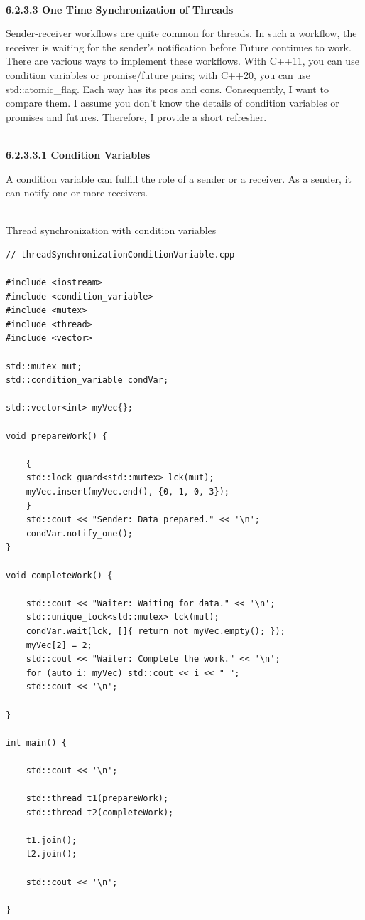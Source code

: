 \hspace*{\fill} \\ %
\noindent
\textbf{6.2.3.3\hspace{0.2cm} One Time Synchronization of Threads}

Sender-receiver workflows are quite common for threads. In such a workflow, the receiver is waiting for the sender’s notification before Future continues to work. There are various ways to implement these workflows. With C++11, you can use condition variables or promise/future pairs; with C++20, you can use std::atomic\_flag. Each way has its pros and cons. Consequently, I want to compare them. I assume you don’t know the details of condition variables or promises and futures. Therefore, I provide a short refresher.

\hspace*{\fill} \\ %
\noindent
\textbf{6.2.3.3.1\hspace{0.2cm} Condition Variables}

A condition variable can fulfill the role of a sender or a receiver. As a sender, it can notify one or more receivers.

\hspace*{\fill} \\ %
\noindent
Thread synchronization with condition variables
\begin{lstlisting}[style=styleCXX]
// threadSynchronizationConditionVariable.cpp

#include <iostream>
#include <condition_variable>
#include <mutex>
#include <thread>
#include <vector>

std::mutex mut;
std::condition_variable condVar;

std::vector<int> myVec{};

void prepareWork() {

	{
	std::lock_guard<std::mutex> lck(mut);
	myVec.insert(myVec.end(), {0, 1, 0, 3});
	}
	std::cout << "Sender: Data prepared." << '\n';
	condVar.notify_one();
}

void completeWork() {

	std::cout << "Waiter: Waiting for data." << '\n';
	std::unique_lock<std::mutex> lck(mut);
	condVar.wait(lck, []{ return not myVec.empty(); });
	myVec[2] = 2;
	std::cout << "Waiter: Complete the work." << '\n';
	for (auto i: myVec) std::cout << i << " ";
	std::cout << '\n';

}

int main() {

	std::cout << '\n';
	
	std::thread t1(prepareWork);
	std::thread t2(completeWork);
	
	t1.join();
	t2.join();
	
	std::cout << '\n';

}
\end{lstlisting}

